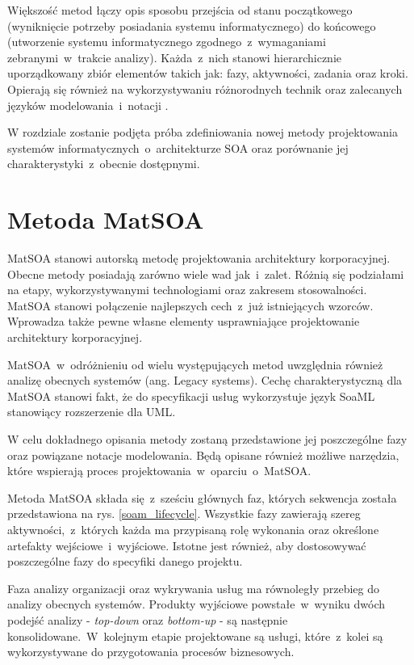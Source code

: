 Większość metod łączy opis sposobu przejścia od stanu początkowego (wyniknięcie potrzeby posiadania systemu informatycznego) do końcowego (utworzenie systemu informatycznego zgodnego~z~wymaganiami zebranymi~w~trakcie analizy). Każda~z~nich stanowi hierarchicznie uporządkowany zbiór elementów takich jak: fazy, aktywności, zadania oraz kroki. Opierają się również na wykorzystywaniu różnorodnych technik oraz zalecanych języków modelowania~i~notacji \cite{OffCompSOAM}.

W rozdziale zostanie podjęta próba zdefiniowania nowej metody projektowania systemów informatycznych~o~architekturze SOA oraz porównanie jej charakterystyki~z~obecnie dostępnymi.


\section{Metoda MatSOA}
MatSOA stanowi autorską metodę projektowania architektury korporacyjnej. Obecne metody posiadają zarówno wiele wad jak~i~zalet. Różnią się podziałami na etapy, wykorzystywanymi technologiami oraz zakresem stosowalności. MatSOA stanowi połączenie najlepszych cech~z~już istniejących wzorców. Wprowadza także pewne własne elementy usprawniające projektowanie architektury korporacyjnej. 

MatSOA~w~odróżnieniu od wielu występujących metod uwzględnia również analizę obecnych systemów (ang. Legacy systems). Cechę charakterystyczną dla MatSOA stanowi fakt, że do specyfikacji usług wykorzystuje język SoaML stanowiący rozszerzenie dla UML. 

W celu dokładnego opisania metody zostaną przedstawione jej poszczególne fazy oraz powiązane notacje modelowania. Będą opisane również możliwe narzędzia, które wspierają proces projektowania~w~oparciu~o~MatSOA.

Metoda MatSOA składa się~z~sześciu głównych faz, których sekwencja została przedstawiona na rys. \ref{soam_lifecycle}. Wszystkie fazy zawierają szereg aktywności,~z~których każda ma przypisaną rolę wykonania oraz określone artefakty wejściowe~i~wyjściowe. Istotne jest również, aby dostosowywać poszczególne fazy do specyfiki danego projektu. 

Faza analizy organizacji oraz wykrywania usług ma równoległy przebieg do analizy obecnych systemów. Produkty wyjściowe powstałe~w~wyniku dwóch podejść analizy - \emph{top-down} oraz \emph{bottom-up} - są następnie konsolidowane.~W~kolejnym etapie projektowane są usługi, które~z~kolei są wykorzystywane do przygotowania procesów biznesowych.

